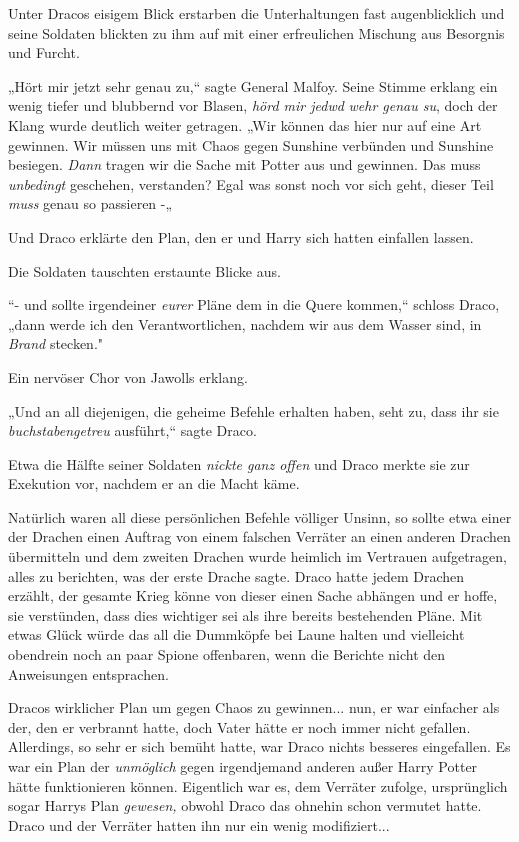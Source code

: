 {Unter Dracos eisigem Blick erstarben die Unterhaltungen fast augenblicklich und seine Soldaten blickten zu ihm auf mit einer erfreulichen Mischung aus Besorgnis und Furcht.

„Hört mir jetzt sehr genau zu,“ sagte General Malfoy. Seine Stimme erklang ein wenig tiefer und blubbernd vor Blasen, \emph{hörd mir jedwd} \emph{wehr genau su}, doch der Klang wurde deutlich weiter getragen. „Wir können das hier nur auf eine Art gewinnen. Wir müssen uns mit Chaos gegen Sunshine verbünden und Sunshine besiegen. \emph{Dann} tragen wir die Sache mit Potter aus und gewinnen. Das muss \emph{unbedingt} geschehen, verstanden? Egal was sonst noch vor sich geht, dieser Teil \emph{muss} genau so passieren -„

Und Draco erklärte den Plan, den er und Harry sich hatten einfallen lassen.

Die Soldaten tauschten erstaunte Blicke aus.

“- und sollte irgendeiner \emph{eurer} Pläne dem in die Quere kommen,“ schloss Draco, „dann werde ich den Verantwortlichen, nachdem wir aus dem Wasser sind, in \emph{Brand} stecken."

Ein nervöser Chor von Jawolls erklang.

„Und an all diejenigen, die geheime Befehle erhalten haben, seht zu, dass ihr sie \emph{buchstabengetreu} ausführt,“ sagte Draco.

Etwa die Hälfte seiner Soldaten \emph{nickte ganz offen} und Draco merkte sie zur Exekution vor, nachdem er an die Macht käme.

Natürlich waren all diese persönlichen Befehle völliger Unsinn, so sollte etwa einer der Drachen einen Auftrag von einem falschen Verräter an einen anderen Drachen übermitteln und dem zweiten Drachen wurde heimlich im Vertrauen aufgetragen, alles zu berichten, was der erste Drache sagte. Draco hatte jedem Drachen erzählt, der gesamte Krieg könne von dieser einen Sache abhängen und er hoffe, sie verstünden, dass dies wichtiger sei als ihre bereits bestehenden Pläne. Mit etwas Glück würde das all die Dummköpfe bei Laune halten und vielleicht obendrein noch an paar Spione offenbaren, wenn die Berichte nicht den Anweisungen entsprachen.

Dracos wirklicher Plan um gegen Chaos zu gewinnen... nun, er war einfacher als der, den er verbrannt hatte, doch Vater hätte er noch immer nicht gefallen. Allerdings, so sehr er sich bemüht hatte, war Draco nichts besseres eingefallen. Es war ein Plan der \emph{unmöglich} gegen irgendjemand anderen außer Harry Potter hätte funktionieren können. Eigentlich war es, dem Verräter zufolge, ursprünglich sogar Harrys Plan \emph{gewesen,} obwohl Draco das ohnehin schon vermutet hatte. Draco und der Verräter hatten ihn nur ein wenig modifiziert...

}
